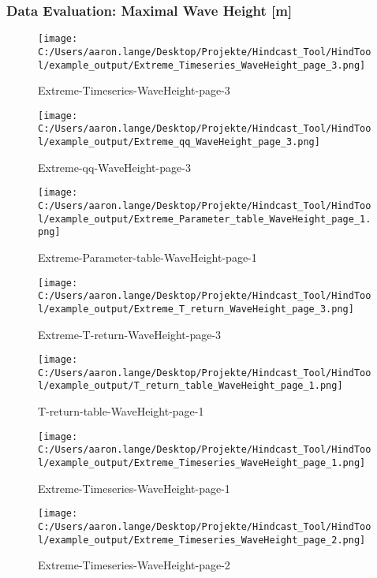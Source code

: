 \subsubsection{Data Evaluation: Maximal Wave Height [m]} 
\begin{figure}[H] 
 \centering 
 \texttt{[image: C:/Users/aaron.lange/Desktop/Projekte/Hindcast\_Tool/HindTool/example\_output/Extreme\_Timeseries\_WaveHeight\_page\_3.png]} 
 \caption{ Extreme-Timeseries-WaveHeight-page-3 } 
 \label{fig: Extreme_Timeseries_WaveHeight_page_3 } 
\end{figure}
\begin{figure}[H] 
 \centering 
 \texttt{[image: C:/Users/aaron.lange/Desktop/Projekte/Hindcast\_Tool/HindTool/example\_output/Extreme\_qq\_WaveHeight\_page\_3.png]} 
 \caption{ Extreme-qq-WaveHeight-page-3 } 
 \label{fig: Extreme_qq_WaveHeight_page_3 } 
\end{figure}
\begin{figure}[H] 
 \centering 
 \texttt{[image: C:/Users/aaron.lange/Desktop/Projekte/Hindcast\_Tool/HindTool/example\_output/Extreme\_Parameter\_table\_WaveHeight\_page\_1.png]} 
 \captionsetup{type=table} 
\caption{ Extreme-Parameter-table-WaveHeight-page-1 } 
 \label{tab: Extreme_Parameter_table_WaveHeight_page_1 } 
\end{figure}
\begin{figure}[H] 
 \centering 
 \texttt{[image: C:/Users/aaron.lange/Desktop/Projekte/Hindcast\_Tool/HindTool/example\_output/Extreme\_T\_return\_WaveHeight\_page\_3.png]} 
 \caption{ Extreme-T-return-WaveHeight-page-3 } 
 \label{fig: Extreme_T_return_WaveHeight_page_3 } 
\end{figure}
\begin{figure}[H] 
 \centering 
 \texttt{[image: C:/Users/aaron.lange/Desktop/Projekte/Hindcast\_Tool/HindTool/example\_output/T\_return\_table\_WaveHeight\_page\_1.png]} 
 \captionsetup{type=table} 
\caption{ T-return-table-WaveHeight-page-1 } 
 \label{tab: T_return_table_WaveHeight_page_1 } 
\end{figure}
\begin{figure}[H] 
 \centering 
 \texttt{[image: C:/Users/aaron.lange/Desktop/Projekte/Hindcast\_Tool/HindTool/example\_output/Extreme\_Timeseries\_WaveHeight\_page\_1.png]} 
 \caption{ Extreme-Timeseries-WaveHeight-page-1 } 
 \label{fig: Extreme_Timeseries_WaveHeight_page_1 } 
\end{figure}
\begin{figure}[H] 
 \centering 
 \texttt{[image: C:/Users/aaron.lange/Desktop/Projekte/Hindcast\_Tool/HindTool/example\_output/Extreme\_Timeseries\_WaveHeight\_page\_2.png]} 
 \caption{ Extreme-Timeseries-WaveHeight-page-2 } 
 \label{fig: Extreme_Timeseries_WaveHeight_page_2 } 
\end{figure}
